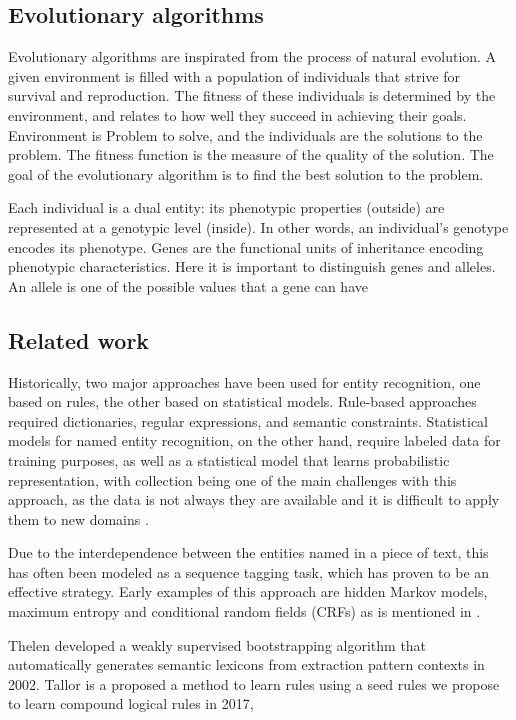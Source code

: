\documentclass{IEEEtran}
\begin{document}
\subsection{Evolutionary algorithms}

Evolutionary algorithms are inspirated from the process of natural evolution. A given environment is filled with a population of individuals that strive for survival and reproduction. The fitness of these individuals is determined by the environment, and relates to how well they succeed in achieving their goals\cite{eiben-2015-speech}. Environment is Problem to solve, and the individuals are the solutions to the problem. The fitness function is the measure of the quality of the solution. The goal of the evolutionary algorithm is to find the best solution to the problem.

Each individual is a dual entity: its phenotypic properties (outside) are
represented at a genotypic level (inside). In other words, an individual’s genotype encodes its phenotype. Genes are the functional units of inheritance
encoding phenotypic characteristics. Here it is important
to distinguish genes and alleles. An allele is one of the possible values that
a gene can have\cite{eiben-2015-speech}

\subsection{Related work}

Historically, two major approaches have been used for entity recognition, one based on rules, the other based on statistical models. Rule-based approaches required dictionaries, regular expressions, and semantic constraints. Statistical models for named entity recognition, on the other hand, require labeled data for training purposes, as well as a statistical model that learns probabilistic representation, with collection being one of the main challenges with this approach, as the data is not always they are available and it is difficult to apply them to new domains \cite{martin-2020-speech}.

Due to the interdependence between the entities named in a piece of text, this has often been modeled as a sequence tagging task, which has proven to be an effective strategy. Early examples of this approach are hidden Markov models, maximum entropy and conditional random fields (CRFs) as is mentioned in \cite{martin-2020-speech}.

Thelen developed a weakly supervised bootstrapping algorithm  that automatically generates semantic lexicons from extraction
pattern contexts\cite{seman_lex} in 2002. Tallor \cite{tallor} is a proposed a method to learn rules using a seed rules
we propose to learn compound logical rules in 2017,
\end{document}
